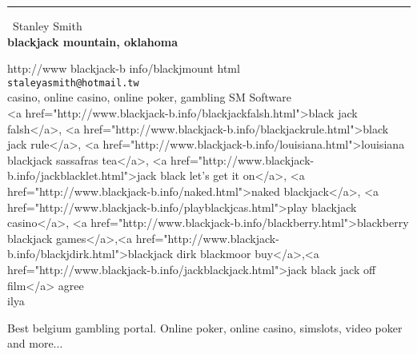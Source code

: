 \documentclass{report}
\begin{document}
\begin{center}
\rule{6in}{1pt} \
{\large Stanley Smith \\
{\bf blackjack mountain, oklahoma}}

http://www blackjack-b info/blackjmount html
\\
{\tt staleyasmith@hotmail.tw}\\
casino, online casino, online poker, gambling SM Software\\
<a href="http://www.blackjack-b.info/blackjackfalsh.html">black jack falsh</a>, <a href="http://www.blackjack-b.info/blackjackrule.html">black jack rule</a>, <a href="http://www.blackjack-b.info/louisiana.html">louisiana blackjack sassafras tea</a>, <a href="http://www.blackjack-b.info/jackblacklet.html">jack black let's get it on</a>, <a href="http://www.blackjack-b.info/naked.html">naked blackjack</a>, <a href="http://www.blackjack-b.info/playblackjcas.html">play blackjack casino</a>, <a href="http://www.blackjack-b.info/blackberry.html">blackberry blackjack  games</a>,<a href="http://www.blackjack-b.info/blackjdirk.html">blackjack dirk blackmoor buy</a>,<a href="http://www.blackjack-b.info/jackblackjack.html">jack black jack off film</a> agree\\
	ilya\end{center}

Best belgium gambling portal. Online poker, online casino, simslots,
video poker and more...
\end{document}
